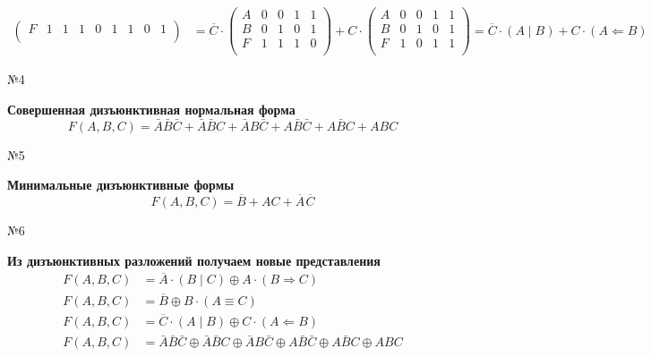 \documentclass[]{article}
\begin{document}
\[\begin{aligned}
\begin{pmatrix}
	F&1&1&1&0&1&1&0&1\\
	\end{pmatrix}
	&=\overline{C}\cdot
	\begin{pmatrix}
	A&0&0&1&1\\
	B&0&1&0&1\\
	F&1&1&1&0\\
	\end{pmatrix}
	+C\cdot
	\begin{pmatrix}
	A&0&0&1&1\\
	B&0&1&0&1\\
	F&1&0&1&1\\
	\end{pmatrix}
	=\overline{C}\cdot (A\mid B)+C\cdot (A\Leftarrow B) 
\end{aligned}
	\]
	\begin{center}\begin{large}{№4}\end{large}\end{center}
	\textbf{Совершенная дизъюнктивная нормальная форма}
	\begin{equation}
	F(A,B,C)=\bar{A}\bar{B}\bar{C}+\bar{A}\bar{B}C+\bar{A}B\bar{C}+A\bar{B}\bar{C}+A\bar{B}C+ABC
	\end{equation}
	\begin{center}\begin{large}{№5}\end{large}\end{center}
	\textbf{Минимальные дизъюнктивные формы}
	\begin{equation}
	F(A,B,C)=\overline{B}+AC+\overline{A}\hspace{1pt}\overline{C}
	\end{equation}
	\begin{center}\begin{large}{№6}\end{large}\end{center}
	
	\textbf{Из дизъюнктивных разложений получаем новые представления}
	\[
	\begin{aligned}
		F(A,B,C)&=\overline{A}\cdot (B\mid C)\oplus A\cdot (B\Rightarrow C) \\
		F(A,B,C)&=\overline{B}\oplus B\cdot (A\equiv C)\\
		F(A,B,C)&=\overline{C}\cdot (A\mid B)\oplus C\cdot (A\Leftarrow B) \\
		F(A,B,C)&=\bar{A}\bar{B}\bar{C}\oplus \bar{A}\bar{B}C\oplus\bar{A}B\bar{C}\oplus A\bar{B}\bar{C}\oplus A\bar{B}C\oplus ABC
	\end{aligned}
	\]
	
\end{document}
